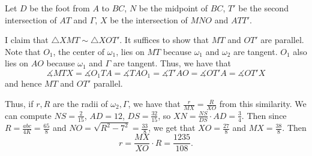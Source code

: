 Let $D$ be the foot from $A$ to $BC$, $N$ be the midpoint of $BC$, $T'$ be the second intersection of $AT$ and $\Gamma$, $X$ be the intersection of $MNO$ and $ATT'$.

I claim that $\triangle{XMT}\sim\triangle{XOT'}$. It suffices to show that $MT$ and $OT'$ are parallel. Note that $O_1$, the center of $\omega_1$, lies on $MT$ because $\omega_1$ and $\omega_2$ are tangent. $O_1$ also lies on $AO$ because $\omega_1$ and $\Gamma$ are tangent. Thus, we have that \[\measuredangle{MTX}=\measuredangle{O_1TA}=\measuredangle{TAO_1}=\measuredangle{T'AO}=\measuredangle{OT'A}=\measuredangle{OT'X}\] and hence $MT$ and $OT'$ parallel.

Thus, if $r,R$ are the radii of $\omega_2,\Gamma$, we have that $\frac{r}{MX}=\frac{R}{XO}$ from this similarity. We can compute $NS=\frac{2}{15}$, $AD=12$, $DS=\frac{32}{15}$, so $XN=\frac{NS}{DS}\cdot AD=\frac{3}{4}$. Then since $R=\frac{abc}{4K}=\frac{65}{8}$ and $NO=\sqrt{R^2-7^2}=\frac{33}{8}$, we get that $XO=\frac{27}{8}$ and $MX=\frac{38}{8}$. Then \[r=\frac{MX}{XO}\cdot R=\boxed{\frac{1235}{108}}.\]
